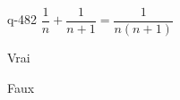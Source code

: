 \begin{truefalse}{q-482}
$\dfrac{1}{n}+ \dfrac{1}{n+1} =\dfrac{1}{n(n+1)}$
\item Vrai
\item* Faux
\end{truefalse}

